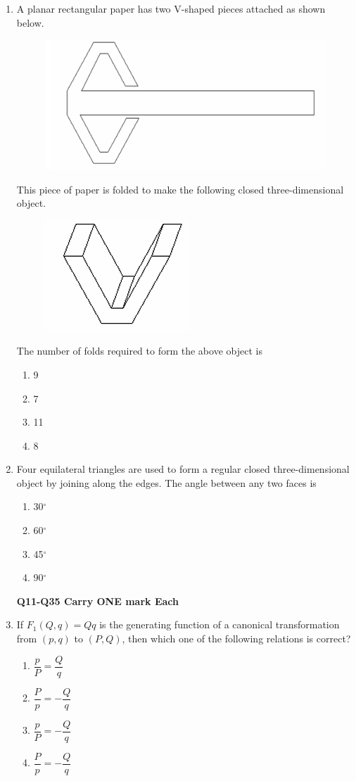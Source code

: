 \documentclass[journal,12pt,onecolumn]{IEEEtran}
\theoremstyle{remark}
\begin{document}
\begin{enumerate}
\item A planar rectangular paper has two V-shaped pieces attached as shown below.
\begin{figure}[H]
    \centering
    \includegraphics[width = 0.6\columnwidth]{fig/Q9.png}
    \caption*{}
    \label{fig:Q9}
\end{figure}
This piece of paper is folded to make the following closed three-dimensional object.
\begin{figure}[H]
    \centering
    \includegraphics[width = 0.2\columnwidth]{fig/Q9(2).png}
    \caption*{}
    \label{fig:Q9(2)}
\end{figure}
The number of folds required to form the above object is
\begin{enumerate}
    \item 9
    \item 7
    \item 11
    \item 8
\end{enumerate}

\item Four equilateral triangles are used to form a regular closed three-dimensional object by joining along the edges. The angle between any two faces is
\begin{enumerate}
    \item 30$^\circ$
    \item 60$^\circ$
    \item 45$^\circ$
    \item 90$^\circ$
\end{enumerate}
\textbf{Q11-Q35 Carry ONE mark Each}
\item If $F_1(Q, q) = Qq$ is the generating function of a canonical transformation from $(p, q)$ to $(P, Q)$, then which one of the following relations is correct?
\begin{enumerate}
    \item $ \dfrac{p}{P} = \dfrac{Q}{q}$
    \item $ \dfrac{P}{p} = -\dfrac{Q}{q}$
    \item $\dfrac{p}{P} = -\dfrac{Q}{q}$
    \item $\dfrac{P}{p} = -\dfrac{Q}{q}$
\end{enumerate}



\end{enumerate}
\end{document}
